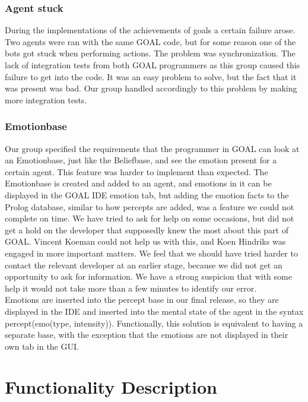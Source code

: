 \documentclass[11pt]{article}
\begin{document}
\subsubsection*{Agent stuck}
During the implementations of the achievements of goals a certain failure arose. Two agents were ran with the same GOAL code, but for some reason one of the bots got stuck when performing actions. The problem was synchronization. The lack of integration tests from both GOAL programmers as this group caused this failure to get into the code. It was an easy problem to solve, but the fact that it was present was bad. Our group handled accordingly to this problem by making more integration tests. 

\subsubsection*{Emotionbase}
Our group specified the requirements that the programmer in GOAL can look at an Emotionbase, just like the Beliefbase, and see the emotion present for a certain agent. This feature was harder to implement than expected. The Emotionbase is created and added to an agent, and emotions in it can be displayed in the GOAL IDE emotion tab, but adding the emotion facts to the Prolog\cite{Prolog} database, similar to how percepts are added, was a feature we could not complete on time. We have tried to ask for help on some occasions, but did not get a hold on the developer that supposedly knew the most about this part of GOAL. Vincent Koeman could not help us with this, and Koen Hindriks was engaged in more important matters. We feel that we should have tried harder to contact the relevant developer at an earlier stage, because we did not get an opportunity to ask for information. We have a strong suspicion that with some help it would not take more than a few minutes to identify our error.\\
Emotions are inserted into the percept base in our final release, so they are displayed in the IDE and inserted into the mental state of the agent in the syntax percept(emo(type, intensity)). Functionally, this solution is equivalent to having a separate base, with the exception that the emotions are not displayed in their own tab in the GUI. 


\section{Functionality Description}
\end{document}
